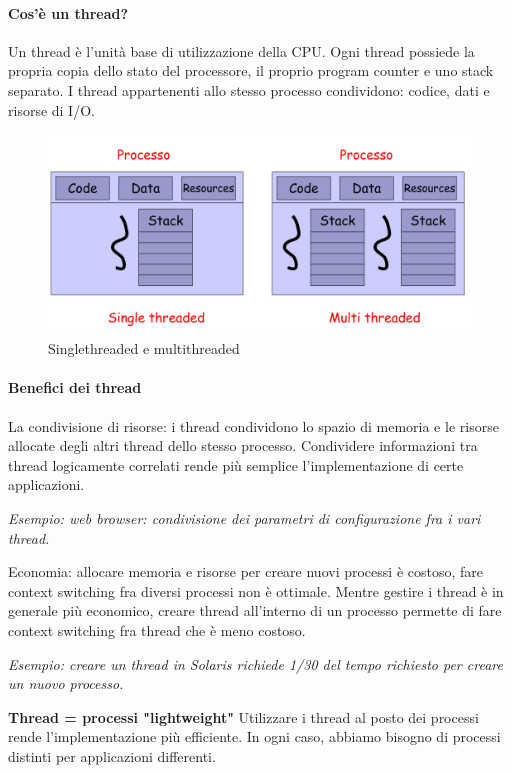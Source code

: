 \paragraph{Cos'è un thread?}
Un thread è l’unità base di utilizzazione della CPU.
Ogni thread possiede la propria copia dello stato del processore, il proprio program counter e uno stack separato.
I thread appartenenti allo stesso processo condividono: codice, dati e risorse di I/O.

\begin{figure} [h]
    \centering
    \includegraphics[width=0.6\linewidth]{Images/Screenshot 2024-12-23 at 12-51-01 so-02.1-scheduling - so-02.1-scheduling.pdf.png}
    \caption{Singlethreaded e multithreaded}
\end{figure}

\paragraph{Benefici dei thread}
La condivisione di risorse: i thread condividono lo spazio di memoria e le risorse allocate degli altri thread dello stesso processo. Condividere informazioni tra thread logicamente correlati rende più semplice l’implementazione di certe applicazioni.

\textit{Esempio: web browser: condivisione dei parametri di configurazione fra i vari thread.}
\newline

Economia: allocare memoria e risorse per creare nuovi processi è costoso, fare context switching fra diversi processi non è ottimale. 
Mentre gestire i thread è in generale più economico, creare thread all’interno di un processo permette di fare context switching fra thread che è meno costoso.

\textit{Esempio: creare un thread in Solaris richiede 1/30 del tempo richiesto per creare un nuovo processo.}

\textbf{Thread = processi "lightweight"}
Utilizzare i thread al posto dei processi rende l’implementazione più efficiente. In ogni caso, abbiamo bisogno di processi distinti per applicazioni differenti.

